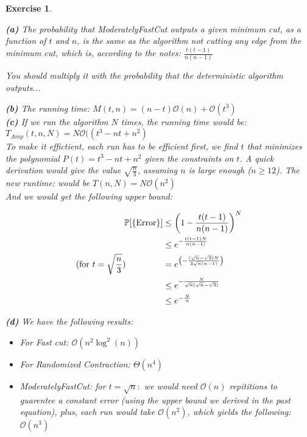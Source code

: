 \documentclass{article}
\newtheorem{exo}{Exercise}
\def\P{\mathbb{P}}
\begin{document}
\begin{exo}{\ \\}
    
\noindent
\textbf{(a)} The probability that ModeratelyFastCut outputs a given minimum cut, as a function of $t$ and $n$, is the same as the algorithm not cutting any edge from the minimum cut, which is, according to the notes: $\frac{t(t-1)}{n(n-1)} $
 
You should multiply it with the probability that the deterministic algorithm outputs...

\noindent
\textbf{(b)}  The running time: $M(t,n) = (n-t) \mathcal{O}(n) + \mathcal{O}(t^3)$ \\

\noindent
\textbf{(c)} If we run the algorithm $N$ times, the running time would be: $T_{Amp}(t,n,N) = N \mathcal{O}((t^3-nt+n^2)$ \\

To make it effictient, each run has to be efficient first, we find $t$ that minimizes the polynomial $P(t) = t^3 -nt + n^2$ given the constraints on $t$. A quick derivation would give the value $\sqrt{\frac{n}{3}}$, assuming $n$ is large enough ($n \geq 12$). The new runtime: would be $T(n, N) = N \mathcal{O}(n^2)$ \\

And we would  get the following upper bound:

\begin{align*}
    \P[\text{\{Error\}}] &\leq \left(1 - \frac{t(t-1)}{n(n-1)}\right)^N \\
                                                    &\leq e^{-\frac{t(t-1)N}{n(n-1)} } \\
                                                   \text{(for $t = \sqrt{\frac{n}{3}}$) \quad \quad  \quad \quad} &= e^{\left(-\frac{(\sqrt{n}-\sqrt{3})N}{3\sqrt{n}(n-1)} \right)} \\
                                                                                                                  &\leq e^{-\frac{N}{\sqrt{n}(\sqrt{n}-\sqrt{3})} } \\
                                                                                                                  &\leq e^{-\frac{N}{n} }
\end{align*}

\noindent
\textbf{(d)}  We have the following results:
\begin{itemize}
    \item For Fast cut: $\mathcal{O}(n^2 \log^2(n))$ 
    \item For Randomized Contraction: $\Theta(n^4)$
    \item ModeratelyFastCut: for $t = \sqrt{n} \colon$ we would need $\mathcal{O}(n)$ repititions to guarentee a constant error (using the upper bound we derived in the past equation), plus, each run would take $\mathcal{O}(n^2)$, which yields the following: $\mathcal{O}(n^3)$
\end{itemize}


\end{exo}
\end{document}
